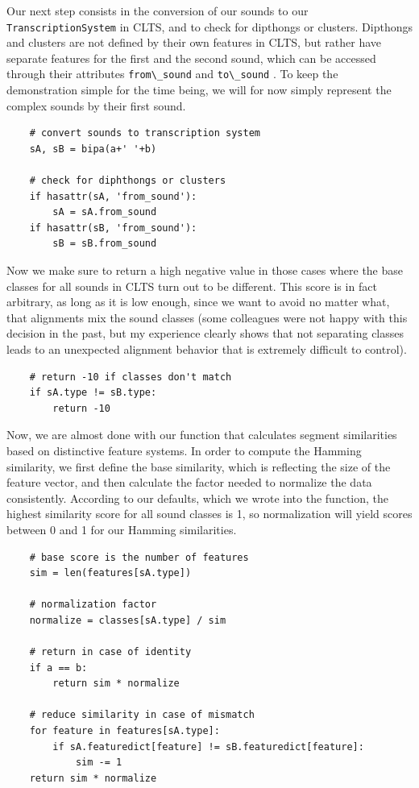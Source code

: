 \documentclass[
  a4paper,
  14pt,
  oneside,
  tablecaptionabove
]{scrbook}
\newcommand{\passthrough}[1]{#1}
\begin{document}
Our next step consists in the conversion of our sounds to our
\passthrough{\lstinline!TranscriptionSystem!} in CLTS, and to check for
dipthongs or clusters. Dipthongs and clusters are not defined by their
own features in CLTS, but rather have separate features for the first
and the second sound, which can be accessed through their attributes
\passthrough{\lstinline!from\_sound!} and
\passthrough{\lstinline!to\_sound!} . To keep the demonstration simple
for the time being, we will for now simply represent the complex sounds
by their first sound.

\begin{lstlisting}
    # convert sounds to transcription system
    sA, sB = bipa(a+' '+b)

    # check for diphthongs or clusters
    if hasattr(sA, 'from_sound'):
        sA = sA.from_sound
    if hasattr(sB, 'from_sound'):
        sB = sB.from_sound
\end{lstlisting}

Now we make sure to return a high negative value in those cases where
the base classes for all sounds in CLTS turn out to be different. This
score is in fact arbitrary, as long as it is low enough, since we want
to avoid no matter what, that alignments mix the sound classes (some
colleagues were not happy with this decision in the past, but my
experience clearly shows that not separating classes leads to an
unexpected alignment behavior that is extremely difficult to control).

\begin{lstlisting}
    # return -10 if classes don't match
    if sA.type != sB.type:
        return -10
\end{lstlisting}

Now, we are almost done with our function that calculates segment
similarities based on distinctive feature systems. In order to compute
the Hamming similarity, we first define the base similarity, which is
reflecting the size of the feature vector, and then calculate the factor
needed to normalize the data consistently. According to our defaults,
which we wrote into the function, the highest similarity score for all
sound classes is 1, so normalization will yield scores between 0 and 1
for our Hamming similarities.

\begin{lstlisting}
    # base score is the number of features
    sim = len(features[sA.type])

    # normalization factor
    normalize = classes[sA.type] / sim

    # return in case of identity
    if a == b:
        return sim * normalize

    # reduce similarity in case of mismatch
    for feature in features[sA.type]:
        if sA.featuredict[feature] != sB.featuredict[feature]:
            sim -= 1
    return sim * normalize
\end{lstlisting}
\end{document}
